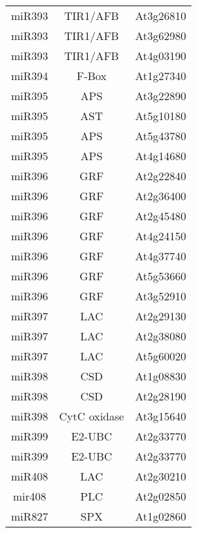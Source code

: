 \begin{table}[htbp!]
\begin{tabular}{ccc}
miR393        & TIR1/AFB     & At3g26810 \\
miR393        & TIR1/AFB     & At3g62980 \\
miR393        & TIR1/AFB     & At4g03190 \\
miR394        & F-Box        & At1g27340 \\
miR395        & APS          & At3g22890 \\
miR395        & AST          & At5g10180 \\
miR395        & APS          & At5g43780 \\
miR395        & APS          & At4g14680 \\
miR396        & GRF          & At2g22840 \\
miR396        & GRF          & At2g36400 \\
miR396        & GRF          & At2g45480 \\
miR396        & GRF          & At4g24150 \\
miR396        & GRF          & At4g37740 \\
miR396        & GRF          & At5g53660 \\
miR396        & GRF          & At3g52910 \\
miR397        & LAC          & At2g29130 \\
miR397        & LAC          & At2g38080 \\
miR397        & LAC          & At5g60020 \\
miR398        & CSD          & At1g08830 \\
miR398        & CSD          & At2g28190 \\
miR398        & CytC oxidase & At3g15640 \\
miR399        & E2-UBC       & At2g33770 \\
miR399        & E2-UBC       & At2g33770 \\
miR408        & LAC          & At2g30210 \\
mir408        & PLC          & At2g02850 \\
miR827        & SPX          & At1g02860
\end{tabular}
\end{table}

